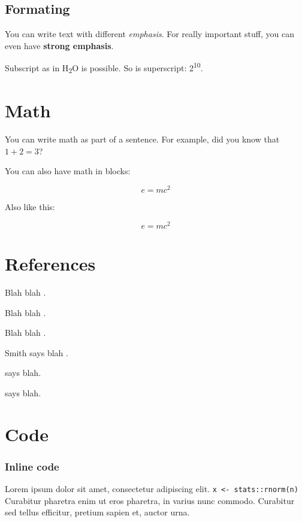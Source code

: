\documentclass{article}
\begin{document}
\subsection{Formating}

You can write text with different \emph{emphasis}. For really important
stuff, you can even have \textbf{strong emphasis}.

Subscript as in H\textsubscript{2}O is possible. So is superscript:
2\textsuperscript{10}.

\section{Math}

You can write math as part of a sentence. For example, did you know that
$1+2=3$?

You can also have math in blocks:

$$e = mc^2$$

Also like this:

\begin{equation}
e = mc^2
\end{equation}

\section{References}

Blah blah \citetext{\citealp[see][pp.~33-35]{doe99}; \citealp[also][chap. 1]{smith04}}.

Blah blah \citep[pp.~33-35 and 38-39]{doe99}.

Blah blah \citep{smith04, doe99}.

Smith says blah \citeyearpar{smith04}.

\citet{smith04} says blah.

\citet[p.~33]{smith04} says blah.

\section{Code}

\subsubsection{Inline code}

Lorem ipsum dolor sit amet, consectetur adipiscing elit.
\lstinline!x <- stats::rnorm(n)! Curabitur pharetra enim ut eros
pharetra, in varius nunc commodo. Curabitur sed tellus efficitur,
pretium sapien et, auctor urna.
\end{document}
